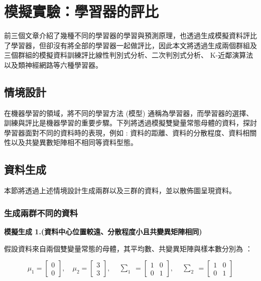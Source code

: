 %   
%

\chapter{模擬實驗：學習器的評比}
前三個文章介紹了幾種不同的學習器的學習與預測原理，也透過生成模擬資料評比了學習器，但卻沒有將全部的學習器一起做評比，因此本文將透過生成兩個群組及三個群組的模擬資料訓練評比線性判別式分析、二次判別式分析、 K-近鄰演算法以及類神經網路等六種學習器。

\section{情境設計}
在機器學習的領域，將不同的學習方法 (模型) 通稱為學習器，而學習器的選擇、訓練與評比是機器學習的重要步驟。下列將透過模擬雙變量常態母體的資料，探討學習器面對不同的資料時的表現，例如 : 資料的距離、資料的分散程度、資料相關性以及共變異數矩陣相不相同等資料型態。

\section{資料生成}
本節將透過上述情境設計生成兩群以及三群的資料，並以散佈圖呈現資料。
\subsection{生成兩群不同的資料}

\textbf{\large 模擬生成 1.(資料中心位置較遠、分散程度小且共變異矩陣相同)}

假設資料來自兩個雙變量常態的母體，其平均數、共變異矩陣與樣本數分別為 ：

\[\mu_1 = \begin{bmatrix}
0 \\
0
\end{bmatrix}, \quad \mu_2 = \begin{bmatrix}
3 \\
3
\end{bmatrix}, \quad \begin{matrix} \sum_{1} \end{matrix} = \begin{bmatrix}
1 & 0\\
0 & 1
\end{bmatrix}, \quad \begin{matrix} \sum_{2} \end{matrix} = \begin{bmatrix}
1 & 0\\
0 & 1
\end{bmatrix}\]


